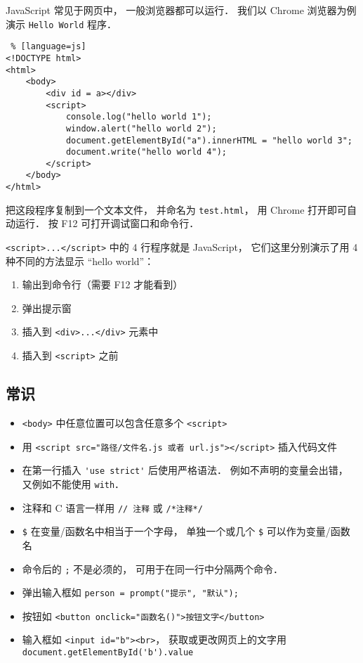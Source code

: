 
JavaScript 常见于网页中， 一般浏览器都可以运行． 我们以 Chrome 浏览器为例演示 \verb|Hello World| 程序．

\begin{lstlisting} % [language=js]
<!DOCTYPE html>
<html>
	<body>
		<div id = a></div>
		<script>
            console.log("hello world 1");
            window.alert("hello world 2");
			document.getElementById("a").innerHTML = "hello world 3";
            document.write("hello world 4");
		</script>
	</body>
</html>
\end{lstlisting}
把这段程序复制到一个文本文件， 并命名为 \verb|test.html|， 用 Chrome 打开即可自动运行． 按 F12 可打开调试窗口和命令行．

\verb|<script>...</script>| 中的 4 行程序就是 JavaScript， 它们这里分别演示了用 4 种不同的方法显示 “hello world”：
\begin{enumerate}
\item 输出到命令行（需要 F12 才能看到）
\item 弹出提示窗
\item 插入到 \verb|<div>...</div>| 元素中
\item 插入到 \verb|<script>| 之前
\end{enumerate}

\subsection{常识}
\begin{itemize}
\item \verb|<body>| 中任意位置可以包含任意多个 \verb|<script>|
\item 用 \verb|<script src="路径/文件名.js 或者 url.js"></script>| 插入代码文件
\item 在第一行插入 \verb|'use strict'| 后使用严格语法． 例如不声明的变量会出错， 又例如不能使用 \verb|with|．
\item 注释和 C 语言一样用 \verb|// 注释| 或 \verb|/*注释*/|
\item \verb|$| 在变量/函数名中相当于一个字母， 单独一个或几个 \verb|$| 可以作为变量/函数名
\item 命令后的 \verb|;| 不是必须的， 可用于在同一行中分隔两个命令．
\item 弹出输入框如 \verb|person = prompt("提示", "默认");|
\item 按钮如 \verb|<button onclick="函数名()">按钮文字</button>|
\item 输入框如 \verb|<input id="b"><br>|， 获取或更改网页上的文字用 \verb|document.getElementById('b').value|
\end{itemize}

